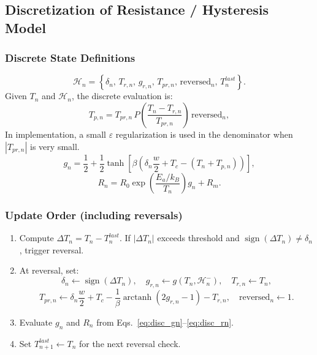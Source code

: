\documentclass[11pt]{article}
\begin{document}
\subsection{Discretization of Resistance / Hysteresis Model}
\subsubsection*{Discrete State Definitions}
\begin{equation}
\mathcal{H}_n=
\left\{
\delta_n,\,
T_{r,n},\,
g_{r,n},\,
T_{pr,n},\,
\mathrm{reversed}_n,\,
T^{last}_n
\right\}.
\label{eq:disc_hysteresis_state}
\end{equation}
Given \(T_n\) and \(\mathcal{H}_n\), the discrete evaluation is:
\begin{equation}
T_{p,n}=T_{pr,n}\,
P\!\left(\frac{T_n-T_{r,n}}{T_{pr,n}}\right)\,
\mathrm{reversed}_n,
\label{eq:disc_tp}
\end{equation}
In implementation, a small \(\varepsilon\) regularization is used in the denominator when \(|T_{pr,n}|\) is very small.
\begin{equation}
g_n=
\frac{1}{2}
+\frac{1}{2}\tanh\!\left[
\beta\left(\delta_n\frac{w}{2}+T_c-(T_n+T_{p,n})\right)
\right],
\label{eq:disc_gn}
\end{equation}
\begin{equation}
R_n=
R_0\exp\!\left(\frac{E_a/k_B}{T_n}\right)g_n+R_m.
\label{eq:disc_rn}
\end{equation}

\subsubsection*{Update Order (including reversals)}
\begin{enumerate}
    \item Compute \(\Delta T_n=T_n-T^{last}_n\). If \(|\Delta T_n|\) exceeds threshold and \(\operatorname{sign}(\Delta T_n)\neq\delta_n\), trigger reversal.
    \item At reversal, set:
    \begin{equation}
    \delta_n\leftarrow \operatorname{sign}(\Delta T_n),\quad
    g_{r,n}\leftarrow g(T_n,\mathcal{H}_n^-),\quad
    T_{r,n}\leftarrow T_n,
    \label{eq:disc_reversal_assign}
    \end{equation}
    \begin{equation}
    T_{pr,n}\leftarrow
    \delta_n\frac{w}{2}+T_c-\frac{1}{\beta}\operatorname{arctanh}(2g_{r,n}-1)-T_{r,n},
    \quad
    \mathrm{reversed}_n\leftarrow 1.
    \label{eq:disc_reversal_tpr}
    \end{equation}
    \item Evaluate \(g_n\) and \(R_n\) from Eqs.~\eqref{eq:disc_gn}--\eqref{eq:disc_rn}.
    \item Set \(T^{last}_{n+1}\leftarrow T_n\) for the next reversal check.
\end{enumerate}
\end{document}
